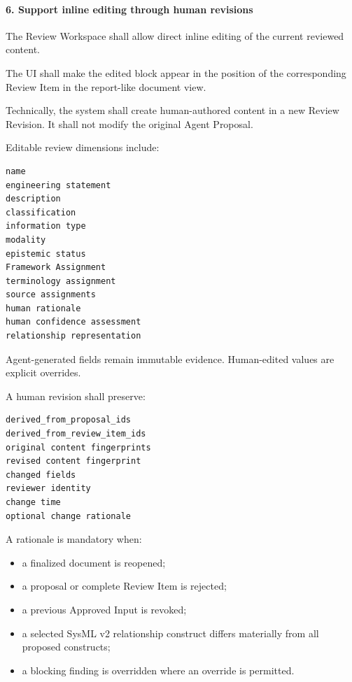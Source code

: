 \hypertarget{6-support-inline-editing-through-human-revisions}{%
\paragraph{6. Support inline editing through human revisions}\label{6-support-inline-editing-through-human-revisions}}

The Review Workspace shall allow direct inline editing of the current reviewed content.

The UI shall make the edited block appear in the position of the corresponding Review Item in the report-like document view.

Technically, the system shall create human-authored content in a new Review Revision. It shall not modify the original Agent Proposal.

Editable review dimensions include:

\begin{verbatim}
name
engineering statement
description
classification
information type
modality
epistemic status
Framework Assignment
terminology assignment
source assignments
human rationale
human confidence assessment
relationship representation
\end{verbatim}

Agent-generated fields remain immutable evidence. Human-edited values are explicit overrides.

A human revision shall preserve:

\begin{verbatim}
derived_from_proposal_ids
derived_from_review_item_ids
original content fingerprints
revised content fingerprint
changed fields
reviewer identity
change time
optional change rationale
\end{verbatim}

A rationale is mandatory when:

\begin{itemize}
\tightlist
\item
  a finalized document is reopened;
\item
  a proposal or complete Review Item is rejected;
\item
  a previous Approved Input is revoked;
\item
  a selected SysML v2 relationship construct differs materially from all proposed constructs;
\item
  a blocking finding is overridden where an override is permitted.
\end{itemize}

